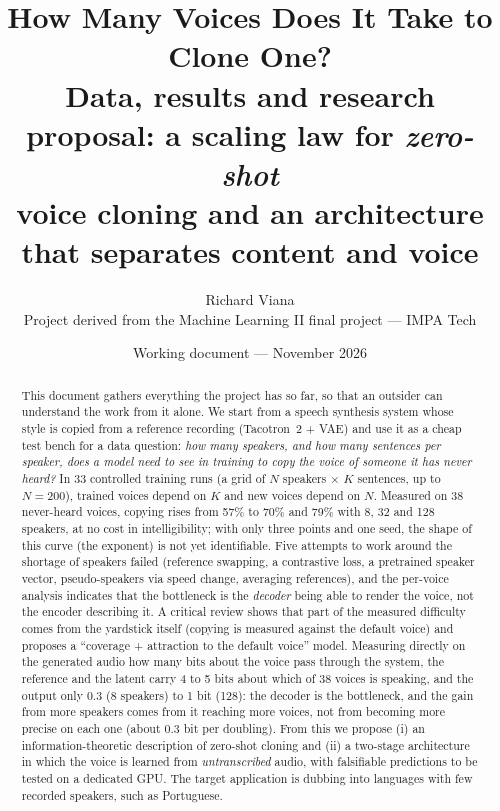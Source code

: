 \documentclass[a4paper,11pt]{article}
\title{\vspace{-1.2cm}\textbf{How Many Voices Does It Take to Clone One?}\\[4pt]
\large Data, results and research proposal: a scaling law for \textit{zero-shot}\\ voice cloning and an architecture that separates content and voice}
\author{Richard Viana\\[2pt]\small Project derived from the Machine Learning II final project --- IMPA Tech}
\date{\small Working document --- November 2026}
\begin{document}
\maketitle

\begin{abstract}
\noindent This document gathers everything the project has so far, so that an outsider can understand the work from it alone. We start from a speech synthesis system whose style is copied from a reference recording (Tacotron~2 + VAE) and use it as a cheap test bench for a data question: \emph{how many speakers, and how many sentences per speaker, does a model need to see in training to copy the voice of someone it has never heard?} In 33 controlled training runs (a grid of $N$ speakers $\times$ $K$ sentences, up to $N=200$), trained voices depend on $K$ and new voices depend on $N$. Measured on 38 never-heard voices, copying rises from 57\% to 70\% and 79\% with 8, 32 and 128 speakers, at no cost in intelligibility; with only three points and one seed, the shape of this curve (the exponent) is not yet identifiable. Five attempts to work around the shortage of speakers failed (reference swapping, a contrastive loss, a pretrained speaker vector, pseudo-speakers via speed change, averaging references), and the per-voice analysis indicates that the bottleneck is the \emph{decoder} being able to render the voice, not the encoder describing it. A critical review shows that part of the measured difficulty comes from the yardstick itself (copying is measured against the default voice) and proposes a ``coverage + attraction to the default voice'' model. Measuring directly on the generated audio how many bits about the voice pass through the system, the reference and the latent carry 4 to 5 bits about which of 38 voices is speaking, and the output only 0.3 (8 speakers) to 1 bit (128): the decoder is the bottleneck, and the gain from more speakers comes from it reaching more voices, not from becoming more precise on each one (about 0.3 bit per doubling). From this we propose (i) an information-theoretic description of zero-shot cloning and (ii) a two-stage architecture in which the voice is learned from \emph{untranscribed} audio, with falsifiable predictions to be tested on a dedicated GPU. The target application is dubbing into languages with few recorded speakers, such as Portuguese.
\end{abstract}

\tableofcontents
\newpage

\end{document}
